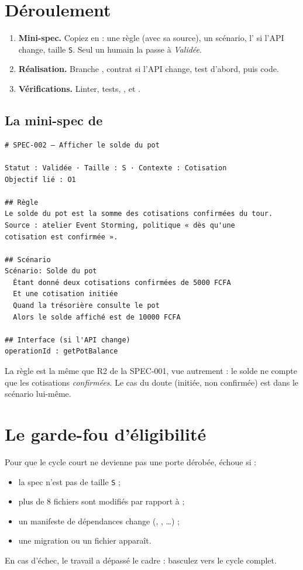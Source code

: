 \section{Déroulement}
\begin{enumerate}
  \item \textbf{Mini-spec.} Copiez  en  : une règle (avec sa source), un scénario, l' si l'API change, taille \texttt{S}. Seul un humain la passe à \emph{Validée}.
  \item \textbf{Réalisation.} Branche , contrat si l'API change, test d'abord, puis code.
  \item \textbf{Vérifications.} Linter, tests, , et .
\end{enumerate}

\subsection*{La mini-spec de \sika{}}
\begin{code}
\begin{Verbatim}
# SPEC-002 — Afficher le solde du pot

Statut : Validée · Taille : S · Contexte : Cotisation
Objectif lié : O1

## Règle
Le solde du pot est la somme des cotisations confirmées du tour.
Source : atelier Event Storming, politique « dès qu'une
cotisation est confirmée ».

## Scénario
Scénario: Solde du pot
  Étant donné deux cotisations confirmées de 5000 FCFA
  Et une cotisation initiée
  Quand la trésorière consulte le pot
  Alors le solde affiché est de 10000 FCFA

## Interface (si l'API change)
operationId : getPotBalance
\end{Verbatim}
\end{code}
La règle est la même que R2 de la SPEC-001, vue autrement : le solde ne compte que les cotisations \emph{confirmées}. Le cas du
doute (initiée, non confirmée) est dans le scénario lui-même.

\section{Le garde-fou d'éligibilité}
Pour que le cycle court ne devienne pas une porte dérobée,  échoue si :
\begin{itemize}
  \item la spec n'est pas de taille \texttt{S} ;
  \item plus de 8 fichiers sont modifiés par rapport à  ;
  \item un manifeste de dépendances change (, , \dots) ;
  \item une migration ou un fichier  apparaît.
\end{itemize}
En cas d'échec, le travail a dépassé le cadre : basculez vers le cycle complet.

